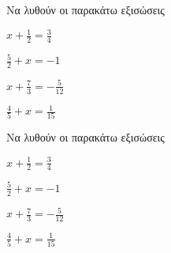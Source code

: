Να λυθούν οι παρακάτω εξισώσεις
\begin{alist}
\item $ x+\frac{1}{2}=\frac{3}{4} $
\item $ \frac{5}{2}+x=-1 $
\item $ x+\frac{7}{3}=-\frac{5}{12} $
\item $ \frac{4}{5}+x=\frac{1}{15} $
\end{alist}
Να λυθούν οι παρακάτω εξισώσεις
\begin{alist}
\item $ x+\frac{1}{2}=\frac{3}{4} $
\item $ \frac{5}{2}+x=-1 $
\item $ x+\frac{7}{3}=-\frac{5}{12} $
\item $ \frac{4}{5}+x=\frac{1}{15} $
\end{alist}

